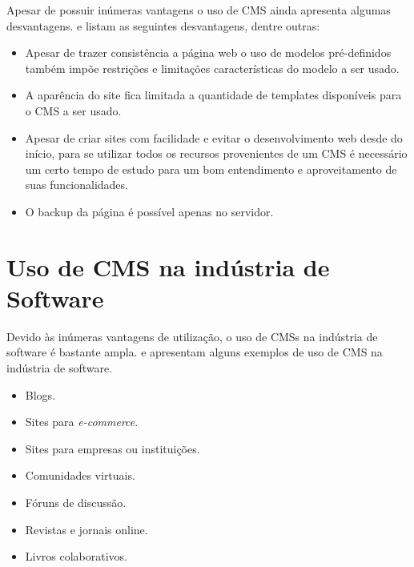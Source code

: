 Apesar de possuir inúmeras vantagens o uso de CMS ainda apresenta algumas desvantagens.  e  listam as seguintes desvantagens, dentre outras: 
\begin{itemize}
\item Apesar de trazer consistência a página web o uso de modelos pré-definidos também impõe restrições e limitações características do modelo a ser usado.
\item A aparência do site fica limitada a quantidade de templates disponíveis para o CMS a ser usado.
\item Apesar de criar sites com facilidade e  evitar   o desenvolvimento web desde do início, para   se   utilizar   todos   os   recursos   provenientes   de   um   CMS   é   necessário   um certo   tempo   de   estudo   para   um bom   entendimento   e   aproveitamento de suas funcionalidades.
\item O backup da página é possível apenas no servidor.
\end{itemize}

\section{Uso de CMS na indústria de Software}
\label{uso_CMS}

Devido às inúmeras vantagens de utilização, o uso de CMSs na indústria de software é bastante ampla.  e  apresentam alguns exemplos de uso de CMS na indústria de software.  %

\begin{itemize}
\item Blogs.
\item Sites para \textit{e-commerce}.
\item Sites para empresas ou instituições.
\item Comunidades virtuais.
\item Fóruns de discussão.
\item Revistas e jornais online.
\item Livros colaborativos.

\end{itemize}


